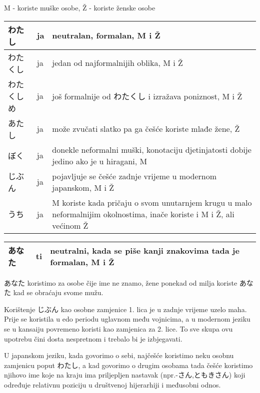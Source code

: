 \newpage
{}

	
		
	M - koriste muške osobe, Ž - koriste ženske osobe
	
	
	\begin{tabular}{|l|l|p{400pt}|}
		\hline
		わたし&ja&neutralan, formalan, M i Ž\\\hline
		わたくし&ja&jedan od najformalnijih oblika, M i Ž\\\hline
		わたくしめ&ja&još formalnije od わたくし i izražava poniznost, M i Ž\\\hline
		あたし&ja&može zvučati slatko pa ga češće koriste mlađe žene, Ž\\\hline
		ぼく&ja&donekle neformalni muški, konotaciju djetinjatosti dobije jedino ako je u hiragani, M\\\hline
		じぶん&ja&pojavljuje se češće zadnje vrijeme u modernom japanskom, M i Ž\\\hline
		うち&ja&M koriste kada pričaju o svom unutarnjem krugu u malo neformalnijim okolnostima, inače koriste i M i Ž, ali većinom Ž\\\hline
	\end{tabular}
	
	\vspace{10pt}
	
		\begin{tabular}{|l|l|l|}
		\hline
		あなた&ti&neutralni, kada se piše kanji znakovima tada je formalan, M i Ž\\\hline
		\end{tabular}
		
		
	\vspace{10pt}
	
	あなた koristimo za osobe čije ime ne znamo, žene ponekad od milja koriste あなた kad se obraćaju svome mužu.
	
	Korištenje じぶん kao osobne zamjenice 1. lica je u zadnje vrijeme uzelo maha. Prije se koristila u edo periodu uglavnom među vojnicima, a u modernom jeziku se u kansaiju povremeno koristi kao zamjenica za 2. lice. To sve skupa ovu upotrebu čini dosta nespretnom i trebalo bi je izbjegavati.
	
	\vspace{10pt}
	
	U japanskom jeziku, kada govorimo o sebi, najčešće koristimo neku osobnu zamjenicu poput わたし, a kad govorimo o drugim osobama tada češće koristimo njihovo ime koje na kraju ima priljepljen nastavak (npr.-さん,ともきさん) koji određuje relativnu poziciju u društvenoj hijerarhiji i međusobni odnos.
	
